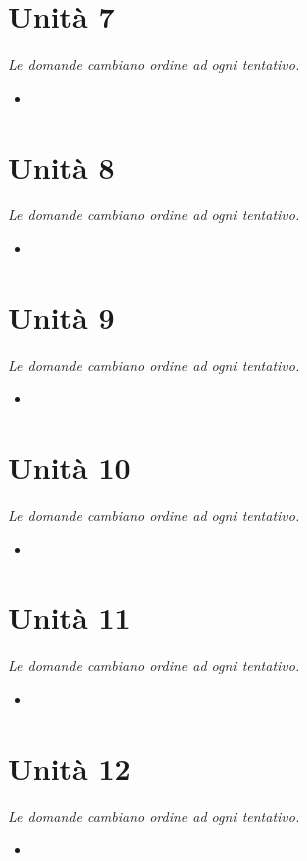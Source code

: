\documentclass[12pt, a4paper]{report}
\begin{document}
\chapter{Unità 7}
    \textit{Le domande cambiano ordine ad ogni tentativo.}
    \begin{itemize}
        \item 
    \end{itemize}
\chapter{Unità 8}
    \textit{Le domande cambiano ordine ad ogni tentativo.}
    \begin{itemize}
        \item 
    \end{itemize}
\chapter{Unità 9}
    \textit{Le domande cambiano ordine ad ogni tentativo.}
    \begin{itemize}
        \item 
    \end{itemize}
\chapter{Unità 10}
    \textit{Le domande cambiano ordine ad ogni tentativo.}
    \begin{itemize}
        \item 
    \end{itemize}
\chapter{Unità 11}
    \textit{Le domande cambiano ordine ad ogni tentativo.}
    \begin{itemize}
        \item 
    \end{itemize}
\chapter{Unità 12}
    \textit{Le domande cambiano ordine ad ogni tentativo.}
    \begin{itemize}
        \item 
    \end{itemize}
\end{document}
